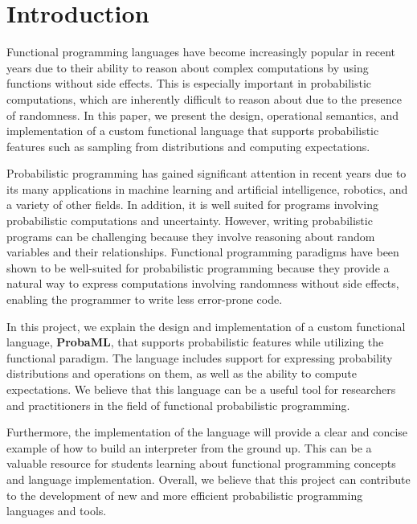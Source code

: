 \documentclass[pageno]{jpaper}
\begin{document}
\tableofcontents

\section{Introduction}
Functional programming languages have become increasingly popular in recent years due to their ability to reason about complex computations by using functions without side effects. This is especially important in probabilistic computations, which are inherently difficult to reason about due to the presence of randomness. In this paper, we present the design, operational semantics, and implementation of a custom functional language that supports probabilistic features such as sampling from distributions and computing expectations.

Probabilistic programming has gained significant attention in recent years due to its many applications in machine learning and artificial intelligence, robotics, and a variety of other fields. In addition, it is well suited for programs involving probabilistic computations and uncertainty. However, writing probabilistic programs can be challenging because they involve reasoning about random variables and their relationships. Functional programming paradigms have been shown to be well-suited for probabilistic programming because they provide a natural way to express computations involving randomness without side effects, enabling the programmer to write less error-prone code.

In this project, we explain the design and implementation of a custom functional language, \textbf{ProbaML}, that supports probabilistic features while utilizing the functional paradigm. The language includes support for expressing probability distributions and operations on them, as well as the ability to compute expectations. We believe that this language can be a useful tool for researchers and practitioners in the field of functional probabilistic programming.

Furthermore, the implementation of the language will provide a clear and concise example of how to build an interpreter from the ground up. This can be a valuable resource for students learning about functional programming concepts and language implementation. Overall, we believe that this project can contribute to the development of new and more efficient probabilistic programming languages and tools.
\end{document}
